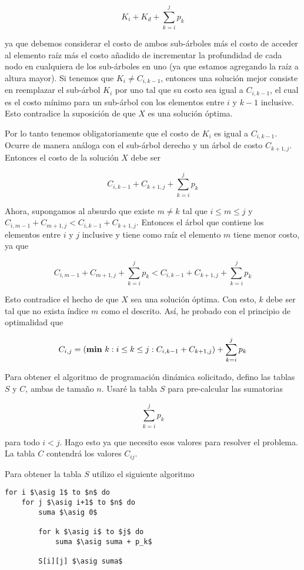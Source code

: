 \documentclass{article}
\newcommand{\asig}{\ensuremath{\leftarrow}}
\begin{document}
$$
K_i + K_d + \sum_{k=i}^j p_k
$$

ya que debemos considerar el costo de ambos sub-árboles más el costo de acceder al
elemento raíz más el costo añadido de incrementar la profundidad de cada nodo en
cualquiera de los sub-árboles en uno (ya que estamos agregando la raíz a altura mayor).
Si tenemos que $K_i \neq C_{i,k-1}$, entonces una solución mejor consiste en reemplazar
el sub-árbol $K_i$ por uno tal que su costo sea igual a $C_{i,k-1}$, el cual es el costo
mínimo para un sub-árbol con los elementos entre $i$ y $k-1$ inclusive. Esto contradice
la suposición de que $X$ es una solución óptima.

Por lo tanto tenemos obligatoriamente que el costo de $K_i$ es igual a $C_{i,k-1}$.
Ocurre de manera análoga con el sub-árbol derecho y un árbol de costo $C_{k+1,j}$.
Entonces el costo de la solución $X$ debe ser 

$$
C_{i,k-1} + C_{k+1,j} + \sum_{k=i}^j p_k
$$

Ahora, supongamos al absurdo que existe $m \neq k$ tal que $i \leq m \leq j$ y
$C_{i,m-1}+C_{m+1,j} < C_{i,k-1}+C_{k+1,j}$. Entonces el árbol que contiene los
elementos entre $i$ y $j$ inclusive y tiene como raíz el elemento $m$ tiene menor
costo, ya que 

$$
C_{i,m-1} + C_{m+1,j} + \sum_{k=i}^j p_k < C_{i,k-1} + C_{k+1,j} + \sum_{k=i}^j p_k
$$

Esto contradice el hecho de que $X$ sea una solución óptima. Con esto, $k$ debe ser tal que
no exista índice $m$ como el descrito. Así, he probado con el principio de optimalidad
que

$$
C_{i,j} = (\text{{\bf min} } k : i \leq k \leq j : C_{i,k-1} + C_{k+1,j}) + \sum_{k=i}^j p_k
$$

Para obtener el algoritmo de programación dinámica solicitado,
defino las tablas $S$ y $C$, ambas de tamaño $n$. Usaré la tabla $S$ para pre-calcular las sumatorias

$$
\sum_{k=i}^j p_k
$$

para todo $i < j$. Hago esto ya que necesito esos valores para resolver el problema. La tabla $C$ contendrá
los valores $C_{ij}$.

Para obtener la tabla $S$ utilizo el siguiente algoritmo

\begin{lstlisting}[caption={Cálculo de la tabla S},label=alg:tablaS]
for i $\asig 1$ to $n$ do
    for j $\asig i+1$ to $n$ do
        suma $\asig 0$

        for k $\asig i$ to $j$ do
            suma $\asig suma + p_k$

        S[i][j] $\asig suma$
\end{lstlisting}
\end{document}
